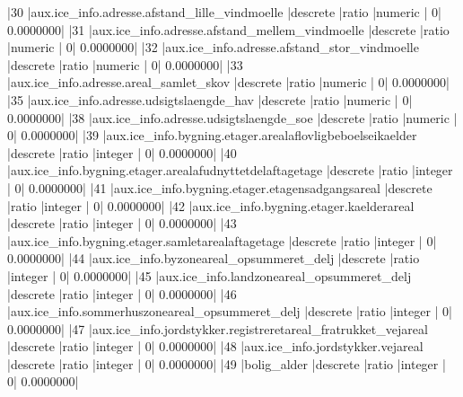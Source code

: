 \documentclass{report}
\begin{document}
\begin{Schunk}
\begin{Soutput}
|30  |aux.ice_info.adresse.afstand_lille_vindmoelle                 |descrete           |ratio          |numeric         |              0|          0.0000000|
|31  |aux.ice_info.adresse.afstand_mellem_vindmoelle                |descrete           |ratio          |numeric         |              0|          0.0000000|
|32  |aux.ice_info.adresse.afstand_stor_vindmoelle                  |descrete           |ratio          |numeric         |              0|          0.0000000|
|33  |aux.ice_info.adresse.areal_samlet_skov                        |descrete           |ratio          |numeric         |              0|          0.0000000|
|35  |aux.ice_info.adresse.udsigtslaengde_hav                       |descrete           |ratio          |numeric         |              0|          0.0000000|
|38  |aux.ice_info.adresse.udsigtslaengde_soe                       |descrete           |ratio          |numeric         |              0|          0.0000000|
|39  |aux.ice_info.bygning.etager.arealaflovligbeboelseikaelder     |descrete           |ratio          |integer         |              0|          0.0000000|
|40  |aux.ice_info.bygning.etager.arealafudnyttetdelaftagetage      |descrete           |ratio          |integer         |              0|          0.0000000|
|41  |aux.ice_info.bygning.etager.etagensadgangsareal               |descrete           |ratio          |integer         |              0|          0.0000000|
|42  |aux.ice_info.bygning.etager.kaelderareal                      |descrete           |ratio          |integer         |              0|          0.0000000|
|43  |aux.ice_info.bygning.etager.samletarealaftagetage             |descrete           |ratio          |integer         |              0|          0.0000000|
|44  |aux.ice_info.byzoneareal_opsummeret_delj                      |descrete           |ratio          |integer         |              0|          0.0000000|
|45  |aux.ice_info.landzoneareal_opsummeret_delj                    |descrete           |ratio          |integer         |              0|          0.0000000|
|46  |aux.ice_info.sommerhuszoneareal_opsummeret_delj               |descrete           |ratio          |integer         |              0|          0.0000000|
|47  |aux.ice_info.jordstykker.registreretareal_fratrukket_vejareal |descrete           |ratio          |integer         |              0|          0.0000000|
|48  |aux.ice_info.jordstykker.vejareal                             |descrete           |ratio          |integer         |              0|          0.0000000|
|49  |bolig_alder                                                   |descrete           |ratio          |integer         |              0|          0.0000000|

\end{Soutput}
\end{Schunk}
\end{document}
